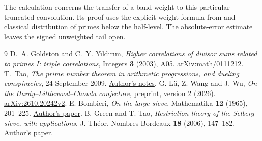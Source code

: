 \documentclass[11pt]{article}
\begin{document}
The calculation concerns the transfer of a band weight to this
particular truncated convolution. Its proof uses the explicit
weight formula from \cite{LWW} and classical distribution of
primes below the half-level. The absolute-error estimate leaves
the signed unweighted tail open.

\begin{thebibliography}{9}
 D.~A. Goldston and C.~Y. Y{\i}ld{\i}r{\i}m,
  \emph{Higher correlations of divisor sums related to primes I:
  triple correlations}, Integers \textbf{3} (2003), A05.
  \href{https://arxiv.org/abs/math/0111212}{arXiv:math/0111212}.
 T.~Tao, \emph{The prime number theorem in arithmetic
  progressions, and dueling conspiracies}, 24 September 2009.
  \href{https://terrytao.wordpress.com/2009/09/24/the-prime-number-theorem-in-arithmetic-progressions-and-dueling-conspiracies/}{Author's notes}.
 G. L\"u, Z. Wang and J. Wu, \emph{On the
Hardy--Littlewood--Chowla conjecture}, preprint, version 2 (2026).
\href{https://arxiv.org/abs/2610.20242v2}{arXiv:2610.20242v2}.
 E. Bombieri, \emph{On the large sieve},
Mathematika \textbf{12} (1965), 201--225.
\href{https://doi.org/10.1112/S0025579300005313}{Author's paper}.
 B. Green and T. Tao, \emph{Restriction theory of
the Selberg sieve, with applications}, J. Th\'eor. Nombres Bordeaux
\textbf{18} (2006), 147--182.
\href{https://www.numdam.org/article/JTNB_2006__18_1_147_0.pdf}{Author's paper}.
\end{thebibliography}
\end{document}
